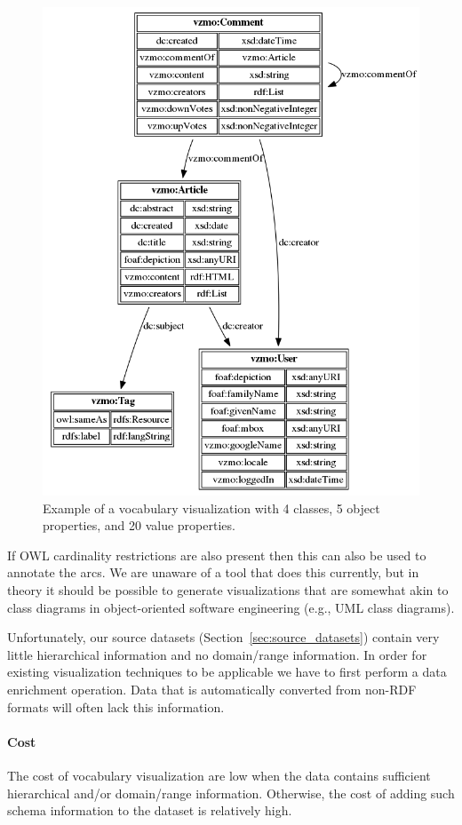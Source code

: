\documentclass[a4paper]{scrartcl}
\begin{document}
\begin{figure}
  \centering
  \includegraphics[width=0.75\linewidth]{img/vocab_viz}
  \caption{Example of a vocabulary visualization with 4 classes, 5
    object properties, and 20 value properties.}
  \label{fig:vocab_viz}
\end{figure}

If OWL cardinality restrictions are also present then this can also be
used to annotate the arcs.  We are unaware of a tool that does this
currently, but in theory it should be possible to generate
visualizations that are somewhat akin to class diagrams in
object-oriented software engineering (e.g., UML class diagrams).

Unfortunately, our source datasets (Section~\ref{sec:source_datasets})
contain very little hierarchical information and no domain/range
information.  In order for existing visualization techniques to be
applicable we have to first perform a data enrichment operation.  Data
that is automatically converted from non-RDF formats will often lack
this information.

\paragraph{Cost}
The cost of vocabulary visualization are low when the data contains
sufficient hierarchical and/or domain/range information.  Otherwise,
the cost of adding such schema information to the dataset is
relatively high.
\end{document}
